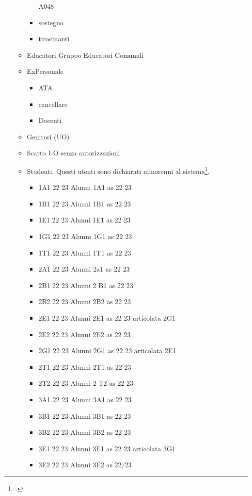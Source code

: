 \begin{itemize}
\begin{itemize}
\begin{itemize}
		A048 
		\item sostegno
		\item tirocinanti
		\end{itemize}
\item  Educatori
Gruppo Educatori Comunali
\item ExPersonale
\begin{itemize}
	\item ATA
	\item cancellare
	\item Docenti
\end{itemize}
\item Genitori (UO)
\item Scarto UO senza autorizzazioni
\item Studenti. Questi utenti sono dichiarati minorenni al sistema\footcite{Google2021b}.
\begin{itemize}
	\item 1A1 22 23
	Alunni 1A1 as 22 23
	\item 1B1 22 23
	Alunni 1B1 as 22 23
	\item 1E1 22 23
	Alunni 1E1 as 22 23	
	\item 1G1 22 23
	Alunni 1G1 as 22 23	
	\item 1T1 22 23
	Alunni 1T1 as 22 23	
	\item 2A1 22 23
	Alunni 2a1 as 22 23	
	\item 2B1 22 23
	Alunni 2 B1 as 22 23	
	\item 2B2 22 23
	Alunni 2B2 as 22 23	
	\item 2E1 22 23
	Alunni 2E1 as 22 23 articolata 2G1	
	\item 2E2 22 23
	Alunni 2E2 as 22 23	
	\item 2G1 22 23
	Alunni 2G1 as 22 23 articolata 2E1	
	\item 2T1 22 23
	Alunni 2T1 as 22 23	
	\item 2T2 22 23
	Alunni 2 T2 as 22 23	
	\item 3A1 22 23
	Alunni 3A1 as 22 23	
	\item 3B1 22 23
	Alunni 3B1 as 22 23	
	\item 3B2 22 23
	Alunni 3B2 as 22 23	
	\item 3E1 22 23
	Alunni 3E1 as 22 23 articolata 3G1	
	\item 3E2 22 23
	Alunni 3E2 as 22/23	

\end{itemize}
\end{itemize}
\end{itemize}
